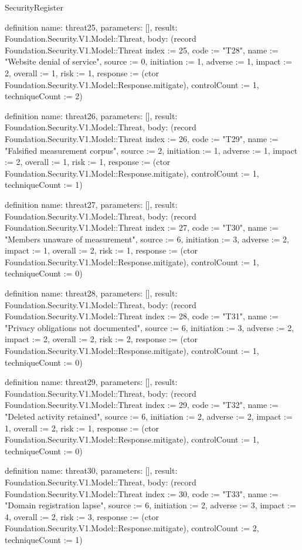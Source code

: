 \begin{lexlean}{SecurityRegister}
\begin{semanticmodule}
definition{
  name: threat25,
  parameters: [],
  result: Foundation.Security.V1.Model::Threat,
  body: (record Foundation.Security.V1.Model::Threat {index := 25, code := "T28", name := "Website denial of service", source := 0, initiation := 1, adverse := 1, impact := 2, overall := 1, risk := 1, response := (ctor Foundation.Security.V1.Model::Response.mitigate), controlCount := 1, techniqueCount := 2})
}

definition{
  name: threat26,
  parameters: [],
  result: Foundation.Security.V1.Model::Threat,
  body: (record Foundation.Security.V1.Model::Threat {index := 26, code := "T29", name := "Falsified measurement corpus", source := 2, initiation := 1, adverse := 1, impact := 2, overall := 1, risk := 1, response := (ctor Foundation.Security.V1.Model::Response.mitigate), controlCount := 1, techniqueCount := 1})
}

definition{
  name: threat27,
  parameters: [],
  result: Foundation.Security.V1.Model::Threat,
  body: (record Foundation.Security.V1.Model::Threat {index := 27, code := "T30", name := "Members unaware of measurement", source := 6, initiation := 3, adverse := 2, impact := 1, overall := 2, risk := 1, response := (ctor Foundation.Security.V1.Model::Response.mitigate), controlCount := 1, techniqueCount := 0})
}

definition{
  name: threat28,
  parameters: [],
  result: Foundation.Security.V1.Model::Threat,
  body: (record Foundation.Security.V1.Model::Threat {index := 28, code := "T31", name := "Privacy obligations not documented", source := 6, initiation := 3, adverse := 2, impact := 2, overall := 2, risk := 2, response := (ctor Foundation.Security.V1.Model::Response.mitigate), controlCount := 1, techniqueCount := 0})
}

definition{
  name: threat29,
  parameters: [],
  result: Foundation.Security.V1.Model::Threat,
  body: (record Foundation.Security.V1.Model::Threat {index := 29, code := "T32", name := "Deleted activity retained", source := 6, initiation := 2, adverse := 2, impact := 1, overall := 2, risk := 1, response := (ctor Foundation.Security.V1.Model::Response.mitigate), controlCount := 1, techniqueCount := 0})
}

definition{
  name: threat30,
  parameters: [],
  result: Foundation.Security.V1.Model::Threat,
  body: (record Foundation.Security.V1.Model::Threat {index := 30, code := "T33", name := "Domain registration lapse", source := 6, initiation := 2, adverse := 3, impact := 4, overall := 2, risk := 3, response := (ctor Foundation.Security.V1.Model::Response.mitigate), controlCount := 2, techniqueCount := 1})
}


\end{semanticmodule}
\end{lexlean}
